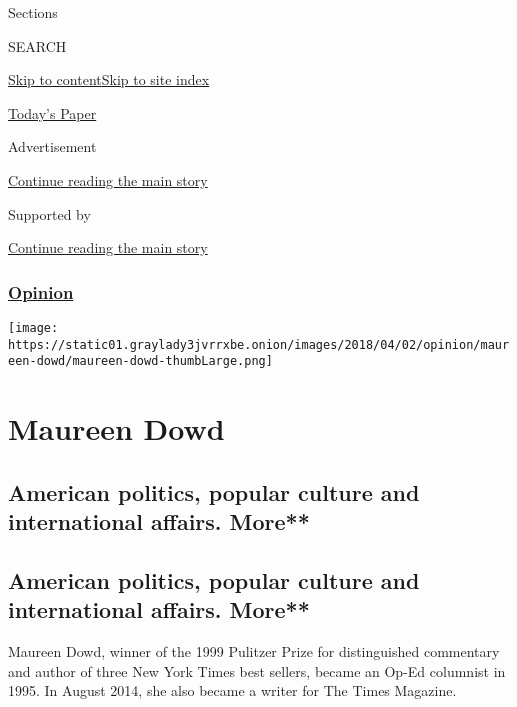 Sections

SEARCH

\protect\hyperlink{site-content}{Skip to
content}\protect\hyperlink{site-index}{Skip to site index}

\href{https://myaccount.nytimes3xbfgragh.onion/auth/login?response_type=cookie\&client_id=vi}{}

\href{https://www.nytimes3xbfgragh.onion/section/todayspaper}{Today's
Paper}

Advertisement

\protect\hyperlink{after-top}{Continue reading the main story}

Supported by

\protect\hyperlink{after-sponsor}{Continue reading the main story}

\hypertarget{opinion}{%
\subsubsection{\texorpdfstring{\href{/section/opinion}{Opinion}}{Opinion}}\label{opinion}}

\texttt{[image: https://static01.graylady3jvrrxbe.onion/images/2018/04/02/opinion/maureen-dowd/maureen-dowd-thumbLarge.png]}

\hypertarget{maureen-dowd}{%
\section{Maureen Dowd}\label{maureen-dowd}}

\hypertarget{american-politics-popular-culture-and-international-affairs-more}{%
\subsection{American politics, popular culture and international
affairs.
More**}\label{american-politics-popular-culture-and-international-affairs-more}}

\hypertarget{american-politics-popular-culture-and-international-affairs-more-1}{%
\subsection{American politics, popular culture and international
affairs.
More**}\label{american-politics-popular-culture-and-international-affairs-more-1}}

Maureen Dowd, winner of the 1999 Pulitzer Prize for distinguished
commentary and author of three New York Times best sellers, became an
Op-Ed columnist in 1995. In August 2014, she also became a writer for
The Times Magazine.

